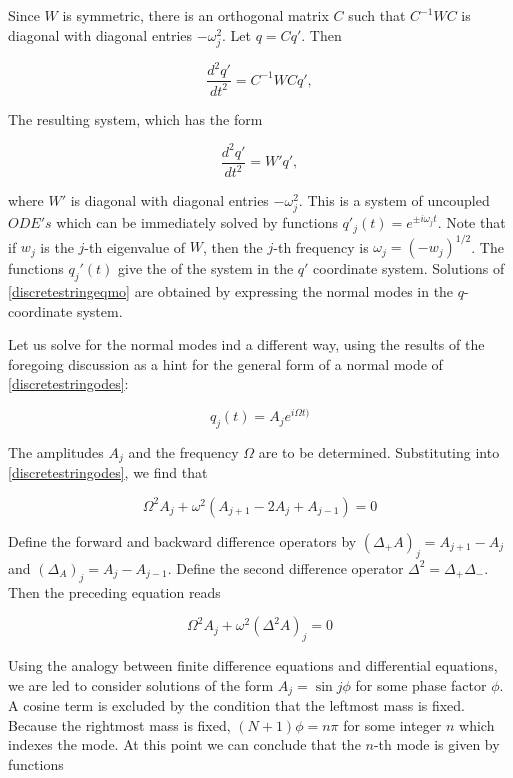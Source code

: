 Since $W$ is symmetric, there is an orthogonal matrix $C$ such that $C^{-1}WC$ is diagonal with diagonal entries $-\omega_j^2$.  Let $q = Cq'$.  Then 

\begin{equation}
\frac{d^2 q'}{ dt^2} = C^{-1}WCq',
\end{equation}

The resulting system, which has the form

\begin{equation}
\frac{d^2 q'}{ dt^2} =W'q',
\end{equation}

where $W'$ is diagonal with diagonal entries $-\omega_j^2$. 
This is a system of uncoupled $ODE's$ which can be immediately solved by functions $q'_j(t) = e^{\pm i \omega_jt}$.  Note that if $w_j$ is the $j$-th eigenvalue of $W$, then the $j$-th frequency is $\omega_j =(-w_j)^{1/2}$. 
The functions $q_j'(t)$ give the  of the system in the $q'$ coordinate system.  Solutions of \eqref{discretestringeqmo} are obtained by expressing the normal modes in the $q$-coordinate system.

Let us solve for the normal modes ind a different way, using the results of the foregoing discussion as a hint for the general form of a normal mode of \eqref{discretestringodes}:

\begin{equation}
q_j(t) = A_j e^{i\Omega t)}
\end{equation}

The amplitudes $A_j$ and the frequency $\Omega$ are to be determined.  Substituting into \eqref{discretestringodes}, we find that

\begin{equation}
\label{discretestringdifferenceeq}
\Omega^2A_j + \omega^2(A_{j+1} - 2A_j + A_{j-1}) = 0
\end{equation}

Define the forward and backward difference operators by  $(\Delta_+ A)_j = A_{j+1} - A_{j}$ and $(\Delta_ A)_j = A_j - A_{j-1}$. Define the second difference operator $\Delta^2 = \Delta_+\Delta_-$.  Then the preceding equation reads

\begin{equation}
\Omega^2A_j + \omega^2( \Delta^2 A)_j = 0
\end{equation}

Using the analogy between finite difference equations and differential equations, we are led to consider solutions of the form $A_j  = \sin j\phi$ for some phase factor $\phi$.  A cosine term is excluded by the  condition that the leftmost mass is fixed.  Because the rightmost mass is fixed, $(N+1)\phi = n\pi$ for some integer $n$ which indexes the mode.  At this point we can conclude that the $n$-th mode is given by functions

